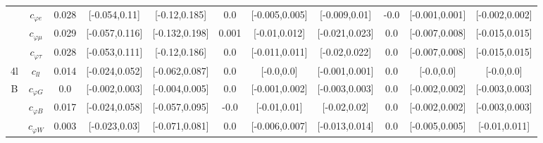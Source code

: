 \documentclass{article}
\begin{document}
\begin{table}[H]
\begin{tabular}{|c|c|c|c|c|c|c|c|c|c|c|}
 & $c_{\varphi e}$ & 0.028                             & [-0.054,0.11]                                 & [-0.12,0.185] & 0.0                             & [-0.005,0.005]                                 & [-0.009,0.01] & -0.0                             & [-0.001,0.001]                                 & [-0.002,0.002] \\ \cline{2-11}
 & $c_{\varphi \mu}$ & 0.029                             & [-0.057,0.116]                                 & [-0.132,0.198] & 0.001                             & [-0.01,0.012]                                 & [-0.021,0.023] & 0.0                             & [-0.007,0.008]                                 & [-0.015,0.015] \\ \cline{2-11}
 & $c_{\varphi \tau}$ & 0.028                             & [-0.053,0.111]                                 & [-0.12,0.186] & 0.0                             & [-0.011,0.011]                                 & [-0.02,0.022] & 0.0                             & [-0.007,0.008]                                 & [-0.015,0.015] \\ \cline{2-11}
\hline
\multirow{1}{*}{4l}
 & $c_{ll}$ & 0.014                             & [-0.024,0.052]                                 & [-0.062,0.087] & 0.0                             & [-0.0,0.0]                                 & [-0.001,0.001] & 0.0                             & [-0.0,0.0]                                 & [-0.0,0.0] \\ \cline{2-11}
\hline
\multirow{7}{*}{B}
 & $c_{\varphi G}$ & 0.0                             & [-0.002,0.003]                                 & [-0.004,0.005] & 0.0                             & [-0.001,0.002]                                 & [-0.003,0.003] & 0.0                             & [-0.002,0.002]                                 & [-0.003,0.003] \\ \cline{2-11}
 & $c_{\varphi B}$ & 0.017                             & [-0.024,0.058]                                 & [-0.057,0.095] & -0.0                             & [-0.01,0.01]                                 & [-0.02,0.02] & 0.0                             & [-0.002,0.002]                                 & [-0.003,0.003] \\ \cline{2-11}
 & $c_{\varphi W}$ & 0.003                             & [-0.023,0.03]                                 & [-0.071,0.081] & 0.0                             & [-0.006,0.007]                                 & [-0.013,0.014] & 0.0                             & [-0.005,0.005]                                 & [-0.01,0.011] \\ \cline{2-11}

\end{tabular}
\end{table}
\end{document}
